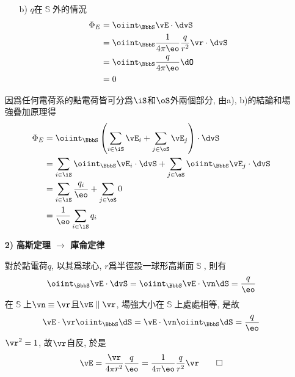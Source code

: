 \begin{solve}
\begin{itemize}
\begin{multicols}{2}
\begin{itemize}
                      \item[b)] $q$在$\BbbS$外的情況
                            \begin{align*}
                                \Phi_E & = \oiint_{\BbbS} \vE \cdot \dvS                                 \\
                                       & = \oiint_{\BbbS} \frac{1}{4\pi\eo} \frac{q}{r^2} \vr \cdot \dvS \\
                                       & = \oiint_{\BbbS} \frac{q}{4\pi\eo} \dO                          \\
                                       & = 0
                            \end{align*}
                  \end{itemize}
              \end{multicols}

              因爲任何電荷系的點電荷皆可分爲$\iS$和$\oS$外兩個部分, 由a), b)的結論和場強疊加原理得
              \begin{align*}
                  \Phi_E & = \oiint_{\BbbS}\left(\sum_{i \in \iS}\vE_i + \sum_{j \in \oS}\vE_j\right)\cdot \dvS            \\
                         & = \sum_{i \in \iS}\oiint_{\BbbS}\vE_i\cdot \dvS + \sum_{j \in \oS}\oiint_{\BbbS}\vE_j\cdot \dvS \\
                         & = \sum_{i \in \iS}\frac{q_i}{\eo} + \sum_{j \in \oS} 0                                          \\
                         & = \frac{1}{\eo}\sum_{i \in \iS} q_i                                                             \\
              \end{align*}


        \item[\textbf{2)}] \textbf{高斯定理 $\rightarrow$ 庫侖定律}

              對於點電荷$q$, 以其爲球心, $r$爲半徑設一球形高斯面$\BbbS$, 則有
              $$\oiint_{\BbbS} \vE \cdot \dvS = \oiint_{\BbbS} \vE \cdot \vn \dS = \frac{q}{\eo}$$
              在$\BbbS$上$\vn \equiv \vr$且$\vE \parallel \vr$, 場強大小在$\BbbS$上處處相等, 是故
              $$\vE \cdot \vr \oiint_{\BbbS} \dS = \vE \cdot \vn \oiint_{\BbbS} \dS = \frac{q}{\eo}$$
              $\vr^2 = 1$, 故$\vr$自反, 於是
              \begin{equation*}
                  \vE = \frac{\vr}{4\pi r^2}\frac{q}{\eo} = \frac{1}{4\pi\eo}\frac{q}{r^2}\vr \qedhere
              \end{equation*}
    \end{itemize}
\end{solve}